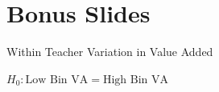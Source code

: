 \documentclass[t,aspectratio=169,11pt]{beamer}
\begin{document}
\appendix
{}





\section{Bonus Slides}


\begin{frame}[label=example]{Within Teacher Variation in Value Added}

    \centering
    $H_0: \text{Low Bin VA} = \text{High Bin VA}$
    \resizebox{.8\textwidth}{!}{}

\hyperlink{het1}{}
\end{frame}
\end{document}
